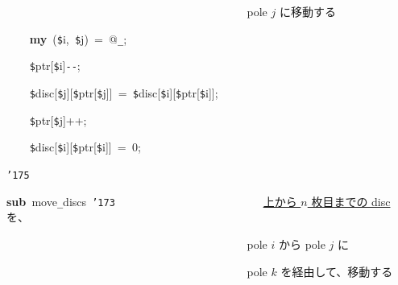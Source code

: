 \documentclass[a4paper,10pt]{article}
\def\mc{\relax}
\begin{document}
\noindent
\mbox{}{\tt\mc \ }{\tt\mc \ }{\tt\mc \ }{\tt\mc \ }{\tt\mc \ }{\tt\mc \ }{\tt\mc \ }{\tt\mc \ }{\tt\mc \ }{\tt\mc \ }{\tt\mc \ }{\tt\mc \ }{\tt\mc \ }{\tt\mc \ }{\tt\mc \ }{\tt\mc \ }{\tt\mc \ }{\tt\mc \ }{\tt\mc \ }{\tt\mc \ }{\tt\mc \ }{\tt\mc \ }{\tt\mc \ }{\tt\mc \ }{\tt\mc \ }{\tt\mc \ }{\tt\mc \ }{\tt\mc \ }{\tt\mc \ }{\tt\mc \ }{\tt\mc \ }{\tt\mc \ }{\tt\mc \ }{\tt\mc \ }{\tt\mc \ }{\tt\mc \ }{\tt\mc \ }{\tt\mc \ }{\tt\mc \ }{\tt\mc \ }\rm\mc {\tt\#} \ pole $j$ に移動する \hfill 
\tt\mc 

\noindent
\mbox{}{\tt\mc \ }{\tt\mc \ }{\tt\mc \ }{\tt\mc \ }\textbf{my}{\tt\mc \ }({\tt\$}i,{\tt\mc \ }{\tt\$}j){\tt\mc \ }={\tt\mc \ }@{\tt\_};

\noindent
\mbox{}{\tt\mc \ }{\tt\mc \ }{\tt\mc \ }{\tt\mc \ }{\tt\$}ptr[{\tt\$}i]{\tt -}{\tt -};

\noindent
\mbox{}{\tt\mc \ }{\tt\mc \ }{\tt\mc \ }{\tt\mc \ }{\tt\$}disc[{\tt\$}j][{\tt\$}ptr[{\tt\$}j]]{\tt\mc \ }={\tt\mc \ }{\tt\$}disc[{\tt\$}i][{\tt\$}ptr[{\tt\$}i]];

\noindent
\mbox{}{\tt\mc \ }{\tt\mc \ }{\tt\mc \ }{\tt\mc \ }{\tt\$}ptr[{\tt\$}j]++;

\noindent
\mbox{}{\tt\mc \ }{\tt\mc \ }{\tt\mc \ }{\tt\mc \ }{\tt\$}disc[{\tt\$}i][{\tt\$}ptr[{\tt\$}i]]{\tt\mc \ }={\tt\mc \ }0;

\noindent
\mbox{}{\tt\char'175}

\noindent
\mbox{}\hfill

\noindent
\mbox{}\textbf{sub}{\tt\mc \ }move{\tt\_}discs{\tt\mc \ }{\tt\char'173}{\tt\mc \ }{\tt\mc \ }{\tt\mc \ }{\tt\mc \ }{\tt\mc \ }{\tt\mc \ }{\tt\mc \ }{\tt\mc \ }{\tt\mc \ }{\tt\mc \ }{\tt\mc \ }{\tt\mc \ }{\tt\mc \ }{\tt\mc \ }{\tt\mc \ }{\tt\mc \ }{\tt\mc \ }{\tt\mc \ }{\tt\mc \ }{\tt\mc \ }{\tt\mc \ }{\tt\mc \ }{\tt\mc \ }{\tt\mc \ }\rm\mc {\tt\#} \ \underline{\textsf{上から $n$ 枚目までの disc}}を、\hfill 
\tt\mc 

\noindent
\mbox{}{\tt\mc \ }{\tt\mc \ }{\tt\mc \ }{\tt\mc \ }{\tt\mc \ }{\tt\mc \ }{\tt\mc \ }{\tt\mc \ }{\tt\mc \ }{\tt\mc \ }{\tt\mc \ }{\tt\mc \ }{\tt\mc \ }{\tt\mc \ }{\tt\mc \ }{\tt\mc \ }{\tt\mc \ }{\tt\mc \ }{\tt\mc \ }{\tt\mc \ }{\tt\mc \ }{\tt\mc \ }{\tt\mc \ }{\tt\mc \ }{\tt\mc \ }{\tt\mc \ }{\tt\mc \ }{\tt\mc \ }{\tt\mc \ }{\tt\mc \ }{\tt\mc \ }{\tt\mc \ }{\tt\mc \ }{\tt\mc \ }{\tt\mc \ }{\tt\mc \ }{\tt\mc \ }{\tt\mc \ }{\tt\mc \ }{\tt\mc \ }\rm\mc {\tt\#} \ pole $i$ から pole $j$ に\hfill 
\tt\mc 

\noindent
\mbox{}{\tt\mc \ }{\tt\mc \ }{\tt\mc \ }{\tt\mc \ }{\tt\mc \ }{\tt\mc \ }{\tt\mc \ }{\tt\mc \ }{\tt\mc \ }{\tt\mc \ }{\tt\mc \ }{\tt\mc \ }{\tt\mc \ }{\tt\mc \ }{\tt\mc \ }{\tt\mc \ }{\tt\mc \ }{\tt\mc \ }{\tt\mc \ }{\tt\mc \ }{\tt\mc \ }{\tt\mc \ }{\tt\mc \ }{\tt\mc \ }{\tt\mc \ }{\tt\mc \ }{\tt\mc \ }{\tt\mc \ }{\tt\mc \ }{\tt\mc \ }{\tt\mc \ }{\tt\mc \ }{\tt\mc \ }{\tt\mc \ }{\tt\mc \ }{\tt\mc \ }{\tt\mc \ }{\tt\mc \ }{\tt\mc \ }{\tt\mc \ }\rm\mc {\tt\#} \ pole $k$ を経由して、移動する\hfill 
\tt\mc 
\end{document}
